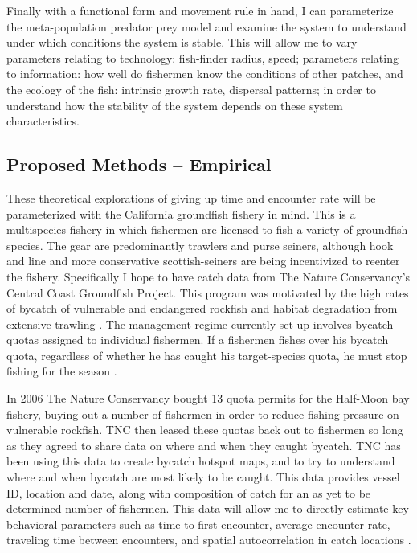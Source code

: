 \documentclass[12pt,a4paper]{report}
\begin{document}
Finally with a functional form and movement rule in hand, I can parameterize the meta-population predator prey model and examine the system to understand under which conditions the system is stable. This will allow me to vary parameters relating to technology: fish-finder radius, speed; parameters relating to information: how well do fishermen know the conditions of other patches, and the ecology of the fish: intrinsic growth rate, dispersal patterns; in order to understand how the stability of the system depends on these system characteristics. 

\subsection{Proposed Methods -- Empirical}
These theoretical explorations of giving up time and encounter rate will be parameterized with the California groundfish fishery in mind. This is a multispecies fishery in which fishermen are licensed to fish a variety of groundfish species. The gear are predominantly trawlers and purse seiners, although hook and line and more conservative scottish-seiners are being incentivized to reenter the fishery. Specifically I hope to have catch data from The Nature Conservancy's Central Coast Groundfish Project. This program was motivated by the high rates of bycatch of vulnerable and endangered rockfish and habitat degradation from extensive trawling \citep{GroundfishTNC}. The management regime currently set up involves bycatch quotas assigned to individual fishermen. If a fishermen fishes over his bycatch quota, regardless of whether he has caught his target-species quota, he must stop fishing for the season \citep{CommercialDigest:2012}. 

In 2006 The Nature Conservancy bought 13 quota permits for the Half-Moon bay fishery, buying out a number of fishermen in order to reduce fishing pressure on vulnerable rockfish. TNC then leased these quotas back out to fishermen so long as they agreed to share data on where and when they caught bycatch. TNC has been using this data to create bycatch hotspot maps, and to try to understand where and when bycatch are most likely to be caught. This data provides vessel ID, location and date, along with composition of catch for an as yet to be determined number of fishermen. This data will allow me to directly estimate key behavioral parameters such as time to first encounter, average encounter rate, traveling time between encounters, and spatial autocorrelation in catch locations \citep{ecatch}. 
\end{document}
